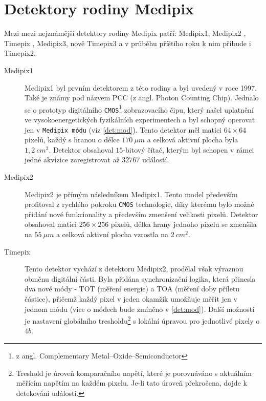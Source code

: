 \section{Detektory rodiny Medipix}\label{det:med}
Mezi mezi nejznámější detektory rodiny Medipix patří: Medipix1, Medipix2 \cite{Llopart-medipix2}, Timepix \cite{Llopart2008106}, Medipix3, nově Timepix3 \cite{timepix3} a v průběhu příštího roku k nim přibude i Timepix2. 

\begin{description}
	\item[Medipix1] Medipix1 byl prvním detektorem z této rodiny a byl uvedený v roce 1997. Také je známy pod názvem PCC (z angl. Photon Counting Chip). Jednalo se o prototyp digitálního \texttt{CMOS}\footnote{z angl. Complementary Metal–Oxide–Semiconductor} zobrazovacího čipu, který našel uplatnění ve vysokoenergetických fyzikálních experimentech \cite{medipix-www} a byl schopný operovat jen v \texttt{Medipix módu} (viz \ref{det:mod}). Tento detektor měl matici $64\times64$ pixelů, každý s hranou o délce $170~\mu m$ a celková aktivní plocha byla $1,2~cm^2$. Detektor obsahoval $15$-bitový čítač, kterým byl schopen v rámci jedné akvizice zaregistrovat až $32767$ událostí.

	\item[Medipix2] Medipix2 je přímým následníkem Medipix1. Tento model především profitoval z rychlého pokroku \texttt{CMOS} technologie, díky kterému bylo možné přidání nové funkcionality a především zmenšení velikosti pixelů. Detektor obsahoval matici $256\times256$ pixelů, délka hrany jednoho pixelu se zmenšila na $55~\mu m$ a celková aktivní plocha vzrostla na $2~cm^2$.

	\item[Timepix]\label{det:tim} Tento detektor vychází z detektoru Medipix2, prodělal však výraznou obměnu digitální části. Byla přidána synchronizační logika, která přinesla dva nové módy - TOT (měření energie) a TOA (měření doby příletu částice), přičemž každý pixel v jeden okamžik umožňuje měřit jen v jednom módu
	(vice o módech bude zmíněno v \ref{det:mod}). Další možností je nastavení globálního tresholdu\footnote{Treshold je úroveň komparačního napětí, které je porovnáváno s aktuálním měřícím napětím na každém pixelu. Je-li tato úroveň překročena, dojde k detekováni události.} s lokální úpravou pro jednotlivé pixely o $4 b$. 


\end{description}
